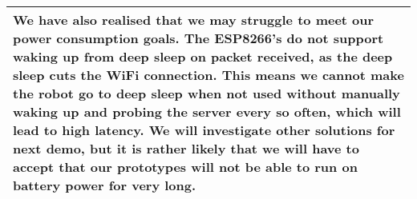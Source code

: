 \documentclass[a4paper]{article}
\newcommand{\colWidth}{141mm}
\begin{document}
\begin{center}
\begin{tabular}{|p{\colWidth}|}
{		\vspace{3mm}
		
		We have also realised that we may struggle to meet our power consumption goals. The ESP8266's do not
		support waking up from deep sleep on packet received, as the deep sleep cuts the WiFi connection.
		This means we cannot make the robot go to deep sleep when not used without manually waking up and
		probing the server every so often, which will lead to high latency. We will investigate other solutions
		for next demo, but it is rather likely that we will have to accept that our prototypes will not
		be able to run on battery power for very long.
		
  	}
  \\
  \hline
\end{tabular}

\end{center}
  
\end{document}

